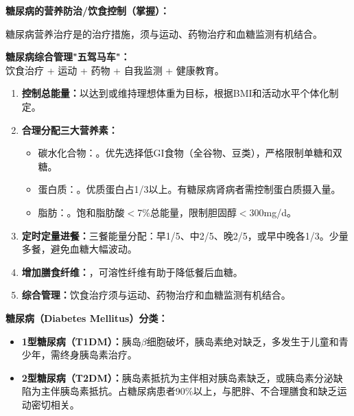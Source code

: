 \begin{keybox}
\textbf{糖尿病的营养防治/饮食控制（掌握）：}

糖尿病营养治疗是的治疗措施，须与运动、药物治疗和血糖监测有机结合。

\textbf{糖尿病综合管理"五驾马车"：}\\
饮食治疗 + 运动 + 药物 + 自我监测 + 健康教育。

\begin{enumerate}[leftmargin=*]
    \item \textbf{控制总能量：}以达到或维持理想体重为目标，根据BMI和活动水平个体化制定。
    \item \textbf{合理分配三大营养素：}
    \begin{itemize}[leftmargin=*]
        \item 碳水化合物：。优先选择低GI食物（全谷物、豆类），严格限制单糖和双糖。
        \item 蛋白质：。优质蛋白占1/3以上。有糖尿病肾病者需控制蛋白质摄入量。
        \item 脂肪：。饱和脂肪酸$<$7\%总能量，限制胆固醇$<$300mg/d。
    \end{itemize}
    \item \textbf{定时定量进餐：}三餐能量分配：早1/5、中2/5、晚2/5，或早中晚各1/3。少量多餐，避免血糖大幅波动。
    \item \textbf{增加膳食纤维：}，可溶性纤维有助于降低餐后血糖。
    \item \textbf{综合管理：}饮食治疗须与运动、药物治疗和血糖监测有机结合。
\end{enumerate}
\end{keybox}

\begin{defbox}
\textbf{糖尿病（Diabetes Mellitus）分类：}
\begin{itemize}[leftmargin=*]
    \item \textbf{1型糖尿病（T1DM）：}胰岛$\beta$细胞破坏，胰岛素绝对缺乏，多发生于儿童和青少年，需终身胰岛素治疗。
    \item \textbf{2型糖尿病（T2DM）：}胰岛素抵抗为主伴相对胰岛素缺乏，或胰岛素分泌缺陷为主伴胰岛素抵抗。占糖尿病患者90\%以上，与肥胖、不合理膳食和缺乏运动密切相关。
\end{itemize}
\end{defbox}

